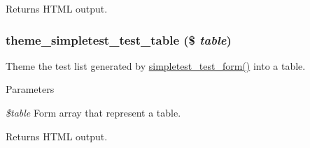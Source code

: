 \begin{DoxyReturn}{Returns}
HTML output. 
\end{DoxyReturn}
\hypertarget{simpletest_8pages_8inc_aa6be38ebfa5a4fb31f3e786c3e4aa415}{
\subsubsection[{theme\_\-simpletest\_\-test\_\-table}]{\setlength{\rightskip}{0pt plus 5cm}theme\_\-simpletest\_\-test\_\-table (\$ {\em table})}}
\label{simpletest_8pages_8inc_aa6be38ebfa5a4fb31f3e786c3e4aa415}
Theme the test list generated by \hyperlink{simpletest_8pages_8inc_ab617b800aa9c77c9456131e0beb65bef}{simpletest\_\-test\_\-form()} into a table.


\begin{DoxyParams}{Parameters}
\item[{\em \$table}]Form array that represent a table. \end{DoxyParams}
\begin{DoxyReturn}{Returns}
HTML output. 
\end{DoxyReturn}
